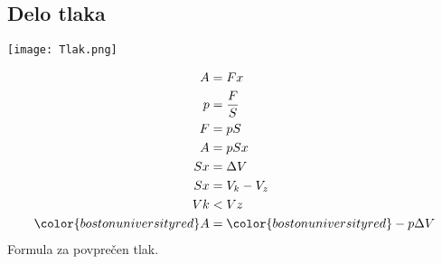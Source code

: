{\color{indiagreen}\subsection{Delo tlaka}}
\begin{center}
	\texttt{[image: Tlak.png]}
\end{center}
\begin{align*}
	A &= Fx\\
	p &= \frac{F}{S}\\
	F &= pS\\
	A &= pSx\\
	Sx &= \Delta V\\
	Sx &= V_k - V_z\\
	Vk &< Vz\\
	{\color{bostonuniversityred}A} &= {\color{bostonuniversityred}-p\Delta V}
\end{align*}
Formula za povprečen tlak.